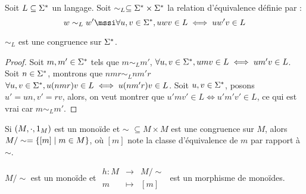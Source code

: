 \begin{definition}
	Soit $L \subseteq \Sigma^{*}$ un langage. Soit $\sim_L \subseteq \Sigma^{*} \times \Sigma^{*}$ la relation d'équivalence définie par :
	$$ w \sim_L w' \mssi \forall u,v \in \mots, uwv \in L \iff u w' v \in L$$
\end{definition}

\begin{prop}
	$\sim_L$ est une congruence sur $\Sigma^{*}$.
\end{prop}

\begin{proof}
	Soit $m, m' \in \Sigma^{*}$ tels que $m \sim_L m'$, \cad $\forall u,v \in \Sigma^{*}, umv \in L \iff um'v \in L$.
	Soit $n \in \Sigma^{*}$, montrons que $nmr \sim_L nm'r$ \cad $\forall u, v \in \Sigma^{*}, u(nmr)v \in L \iff u(nm'r)v \in L$.
	Soit $u,v \in \Sigma^{*}$, posons $u' = un, v' = rv$, alors, on veut montrer que $u'mv' \in L \iff u'm'v' \in L$,
	ce qui est vrai car $m \sim_L m'$.
\end{proof}


\begin{prop}
	Si $(M, \cdot, 1_M)$ est un monoïde et $\sim$ $\subseteq M \times M$ est une congruence sur $M$, alors $M/\sim = \left\{[m] \mid m \in M\right\}$, où $[m]$ note la classe d'équivalence de $m$ par rapport à $\sim$.

	$M/\sim$ est un monoïde et $ \begin{array}{rcl}
			h : M & \to     & M/\sim \\
			m     & \mapsto & [m]
		\end{array} $ est un morphisme de monoïdes.
\end{prop}

